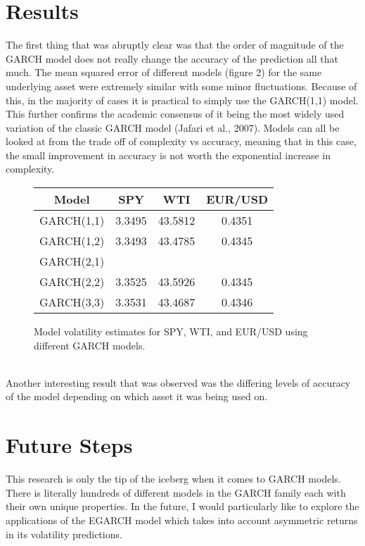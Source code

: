 \documentclass{article}
\begin{document}
\section{Results}
The first thing that was abruptly clear was that the order of magnitude of the GARCH model does not really change the accuracy of the prediction all that much. The mean squared error of different models (figure 2) for the same underlying asset were extremely similar with some minor fluctuations. Because of this, in the majority of cases it is practical to simply use the GARCH(1,1) model. This further confirms the academic consensus of it being the most widely used variation of the classic GARCH model (Jafari et al., 2007). Models can all be looked at from the trade off of complexity vs accuracy, meaning that in this case, the small improvement in accuracy is not worth the exponential increase in complexity.
\begin{figure}[h!]
\centering
\begin{tabular}{||c|c|c|c||}
\hline
Model & SPY & WTI & EUR/USD \\ [0.5ex]
\hline\hline
GARCH(1,1) & 3.3495 & 43.5812 & 0.4351 \\
\hline
GARCH(1,2) & 3.3493 & 43.4785 & 0.4345\\
\hline
GARCH(2,1) & & & \\  %
\hline
GARCH(2,2) & 3.3525 & 43.5926 & 0.4345 \\
\hline
GARCH(3,3) & 3.3531 & 43.4687 & 0.4346 \\
\end{tabular}
\caption{Model volatility estimates for SPY, WTI, and EUR/USD using different GARCH models.}
\end{figure}
\\
Another interesting result that was observed was the differing levels of accuracy of the model depending on which asset it was being used on.


\section{Future Steps}
This research is only the tip of the iceberg when it comes to GARCH models. There is literally hundreds of different models in the GARCH family each with their own unique properties. In the future, I would particularly like to explore the applications of the EGARCH model which takes into account asymmetric returns in its volatility predictions.
\end{document}
